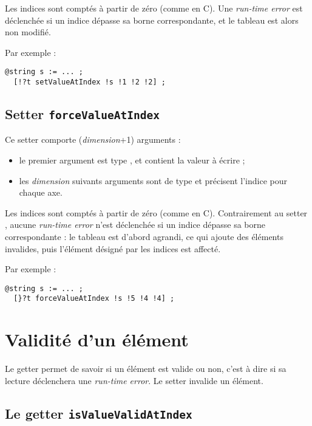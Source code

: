 Les indices sont comptés à partir de zéro (comme en C). Une \emph{run-time error} est déclenchée si un indice dépasse sa borne correspondante, et le tableau est alors non modifié.

Par exemple :
\begin{lstlisting}[language=galgas]
  @string s := ... ;
  [!?t setValueAtIndex !s !1 !2 !2] ;
\end{lstlisting}





\subsection{Setter \texttt{forceValueAtIndex}}

Ce setter comporte (\emph{dimension}+1) arguments :
\begin{itemize}
  \item le premier argument est type , et contient la valeur à écrire ;
  \item les \emph{dimension} suivants arguments sont de type  et précisent l'indice pour chaque axe.
\end{itemize} 
  
Les indices sont comptés à partir de zéro (comme en C). Contrairement au setter , aucune \emph{run-time error} n'est déclenchée si un indice dépasse sa borne correspondante : le tableau est d'abord agrandi, ce qui ajoute des éléments invalides, puis l'élément désigné par les indices est affecté.

Par exemple :
\begin{lstlisting}[language=galgas]
  @string s := ... ;
  [}?t forceValueAtIndex !s !5 !4 !4] ;
\end{lstlisting}





\section{Validité d'un élément}

Le getter  permet de savoir si un élément est valide ou non, c'est à dire si sa lecture déclenchera une \emph{run-time error}. Le setter  invalide un élément.

\subsection{Le getter \texttt{isValueValidAtIndex}}

